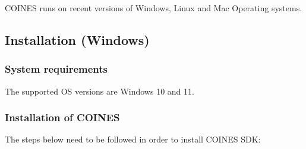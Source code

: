 \documentclass[11pt,headings=small]{scrartcl}
\begin{document}
COINES runs on recent versions of Windows, Linux and Mac Operating systems.

\subsection{Installation (Windows)}

\subsubsection{System requirements}
The supported OS versions are Windows 10 and 11.

\subsubsection{Installation of COINES}
The steps below need to be followed in order to install COINES SDK:
\end{document}

